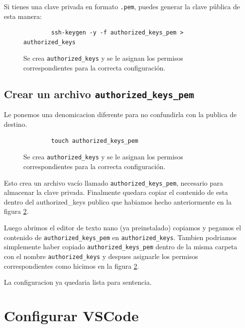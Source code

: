 Si tienes una clave privada en formato \texttt{.pem}, puedes generar la clave pública de esta manera:


\begin{figure}[h!]
    \centering
    \begin{verbatim}
        ssh-keygen -y -f authorized_keys_pem > authorized_keys
    \end{verbatim}
    \caption{Se crea \texttt{authorized\_keys} y se le asignan los permisos correspondientes para la correcta configuración.}
    \label{fig:creamos_authorized_keys}
\end{figure}

\subsection{Crear un archivo \texttt{authorized\_keys\_pem}}

Le ponemos una denomicacion diferente para no confundirla con la publica de destino.

\begin{figure}[h!]
    \centering
    \begin{verbatim}
        touch authorized_keys_pem
    \end{verbatim}
    \caption{Se crea \texttt{authorized\_keys} y se le asignan los permisos correspondientes para la correcta configuración.}
    \label{fig:creamos_authorized_keys}
\end{figure}

Esto crea un archivo vacío llamado \texttt{authorized\_keys\_pem}, necesario para almacenar la clave privada.
Finalmente quedara copiar el contenido de esta dentro del authorized\_keys publico que habiamos hecho anteriormente en la figura \ref{fig:creamos_authorized_keys}.

Luego abrimos el editor de texto nano (ya preinstalado) copiamos y pegamos el contenido de \texttt{authorized\_keys\_pem} en \texttt{authorized\_keys}.
Tambien podriamos simplemente haber copiado \texttt{authorized\_keys\_pem} dentro de la misma carpeta con el nombre \texttt{authorized\_keys} y despues
asignarle los permisos correspondientes como hicimos en la figura \ref{fig:creamos_authorized_keys}.

La configuracion ya quedaria lista para sentencia.

\section{Configurar VSCode}

